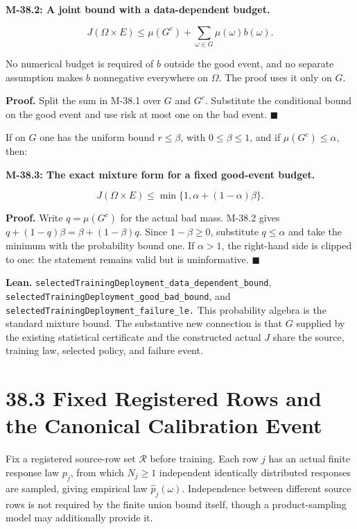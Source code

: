 \documentclass[
  english,
  11pt,
  oneside]{book}
\begin{document}
\hypertarget{m-38-2}{}\label{m-38-2}

\textbf{M-38.2: A joint bound with a data-dependent budget.}

\[J(\Omega\times E)
\le
\mu(G^c)+\sum_{\omega\in G}\mu(\omega)b(\omega).\]

No numerical budget is required of \(b\) outside the good event, and no separate assumption makes \(b\) nonnegative everywhere on \(\Omega\). The proof uses it only on \(G\).

\textbf{Proof.} Split the sum in M-38.1 over \(G\) and \(G^c\). Substitute the conditional bound on the good event and use risk at most one on the bad event. \(\blacksquare\)

If on \(G\) one has the uniform bound \(r\le\beta\), with \(0\le\beta\le1\), and if \(\mu(G^c)\le\alpha\), then:

\hypertarget{m-38-3}{}\label{m-38-3}

\textbf{M-38.3: The exact mixture form for a fixed good-event budget.}

\[J(\Omega\times E)
\le\min\{1,\alpha+(1-\alpha)\beta\}.\]

\textbf{Proof.} Write \(q=\mu(G^c)\) for the actual bad mass. M-38.2 gives \(q+(1-q)\beta=\beta+(1-\beta)q\). Since \(1-\beta\ge0\), substitute \(q\le\alpha\) and take the minimum with the probability bound one. If \(\alpha>1\), the right-hand side is clipped to one: the statement remains valid but is uninformative. \(\blacksquare\)

\textbf{Lean.} \nolinkurl{selectedTrainingDeployment_data_dependent_bound}, \nolinkurl{selectedTrainingDeployment_good_bad_bound}, and \nolinkurl{selectedTrainingDeployment_failure_le.} This probability algebra is the standard mixture bound. The substantive new connection is that \(G\) supplied by the existing statistical certificate and the constructed actual \(J\) share the source, training law, selected policy, and failure event.

\section{38.3 Fixed Registered Rows and the Canonical Calibration Event}\label{fixed-registered-rows-and-the-canonical-calibration-event}

Fix a registered source-row set \(\mathcal R\) before training. Each row \(j\) has an actual finite response law \(p_j\), from which \(N_j\ge1\) independent identically distributed responses are sampled, giving empirical law \(\widehat p_j(\omega)\). Independence between different source rows is not required by the finite union bound itself, though a product-sampling model may additionally provide it.
\end{document}
